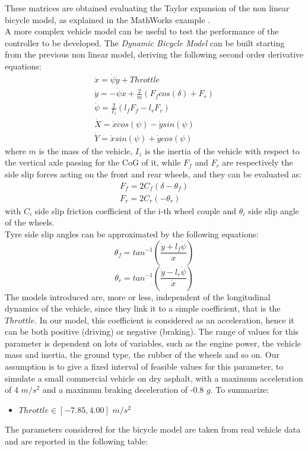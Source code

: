 These matrices are obtained evaluating the Taylor expansion of the non linear bicycle model, as explained in the MathWorks example \cite{StaticObs}.\\
A more complex vehicle model can be useful to test the performance of the controller to be developed. The \textit{Dynamic Bicycle Model} \cite{7225830} can be built starting from the previous non linear model, deriving the following second order derivative equations:
\begin{align}
    \ddot{x} = \dot{\psi}\dot{y} + Throttle\\
    \ddot{y} = -\dot{\psi}\dot{x} + \frac{2}{m}\left(F_fcos(\delta) + F_r\right)     \label{dynamic_equation}\\
    \ddot{\psi} = \frac{2}{I_z}\left(l_fF_f - l_rF_r\right)\\
    \dot{X} = \dot{x}cos(\psi) - \dot{y}sin(\psi)\\
    \dot{Y} = \dot{x}sin(\psi) + \dot{y}cos(\psi)
\end{align}
where $m$ is the mass of the vehicle, $I_z$ is the inertia of the vehicle with respect to the vertical axle passing for the CoG of it, while $F_f$ and $F_r$ are respectively the side slip forces acting on the front and rear wheels, and they can be evaluated as:
\begin{align}
    F_f = 2C_f\left(\delta - \theta_f\right)\\
    F_r = 2C_r\left(-\theta_r\right)
\end{align}
with $C_i$ side slip friction coefficient of the i-th wheel couple and $\theta_i$ side slip angle of the wheels.\\
Tyre side slip angles can be approximated by the following equations:
\begin{equation}
    \theta_f=tan^{-1}\left(\frac{\dot{y} + l_f\dot{\psi}}{\dot{x}}\right)
\end{equation}
\begin{equation}
    \theta_r=tan^{-1}\left(\frac{\dot{y} - l_r\dot{\psi}}{\dot{x}}\right)
\end{equation}
The models introduced are, more or less, independent of the longitudinal dynamics of the vehicle, since they link it to a simple coefficient, that is the $Throttle$. In our model, this coefficient is considered as an acceleration, hence it can be both positive (driving) or negative (braking). The range of values for this parameter is dependent on lots of variables, such as the engine power, the vehicle mass and inertia, the ground type, the rubber of the wheels and so on. Our assumption is to give a fixed interval of feasible values for this parameter, to simulate a small commercial vehicle on dry asphalt, with a maximum acceleration of 4 $m/s^2$ and a maximum braking deceleration of -0.8 $g$. To summarize:
\begin{itemize}
    \item $Throttle \in [-7.85, 4.00]$ $m/s^2$
    \label{item:Throttle}
\end{itemize}
The parameters considered for the bicycle model are taken from real vehicle data \cite{10.2307/44733900} and are reported in the following table:

